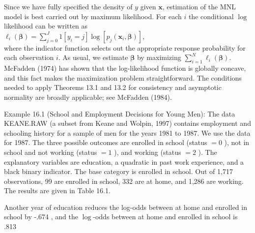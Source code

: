 \documentclass[10pt]{article}
\begin{document}
Since we have fully specified the density of $y$ given $\mathbf{x}$, estimation of the MNL model is best carried out by maximum likelihood. For each $i$ the conditional $\log$ likelihood can be written as\\
$\ell_{i}(\boldsymbol{\beta})=\sum_{j=0}^{J} 1\left[y_{i}=j\right] \log \left[p_{j}\left(\mathbf{x}_{i}, \boldsymbol{\beta}\right)\right]$,\\
where the indicator function selects out the appropriate response probability for each observation $i$. As usual, we estimate $\boldsymbol{\beta}$ by maximizing $\sum_{i=1}^{N} \ell_{i}(\boldsymbol{\beta})$. McFadden (1974) has shown that the log-likelihood function is globally concave, and this fact makes the maximization problem straightforward. The conditions needed to apply Theorems 13.1 and 13.2 for consistency and asymptotic normality are broadly applicable; see McFadden (1984).

Example 16.1 (School and Employment Decisions for Young Men): The data KEANE.RAW (a subset from Keane and Wolpin, 1997) contains employment and schooling history for a sample of men for the years 1981 to 1987. We use the data for 1987. The three possible outcomes are enrolled in school (status $=0$ ), not in school and not working (status $=1$ ), and working (status $=2$ ). The explanatory variables are education, a quadratic in past work experience, and a black binary indicator. The base category is enrolled in school. Out of 1,717 observations, 99 are enrolled in school, 332 are at home, and 1,286 are working. The results are given in Table 16.1.

Another year of education reduces the log-odds between at home and enrolled in school by -.674 , and the $\log$-odds between at home and enrolled in school is .813
\end{document}

